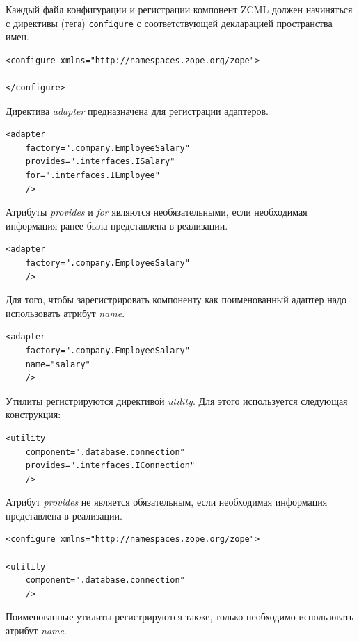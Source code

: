 \documentclass[a4paper,openany,twoside,final]{book}
\providecommand*{\DUroletitlereference}[1]{\textsl{#1}}
\begin{document}
Каждый файл конфигурации и регистрации компонент ZCML должен начиняться с директивы (тега) \texttt{configure} с соответствующей декларацией пространства имен.

\begin{verbatim}
<configure xmlns="http://namespaces.zope.org/zope">

</configure>
\end{verbatim}

Директива \DUroletitlereference{adapter} предназначена для регистрации адаптеров.

\begin{verbatim}
<adapter
    factory=".company.EmployeeSalary"
    provides=".interfaces.ISalary"
    for=".interfaces.IEmployee"
    />
\end{verbatim}

Атрибуты \DUroletitlereference{provides} и \DUroletitlereference{for} являются необязательными, если необходимая информация ранее была представлена в реализации.

\begin{verbatim}
<adapter
    factory=".company.EmployeeSalary"
    />
\end{verbatim}

Для того, чтобы зарегистрировать компоненту как поименованный адаптер надо использовать атрибут \DUroletitlereference{name}.

\begin{verbatim}
<adapter
    factory=".company.EmployeeSalary"
    name="salary"
    />
\end{verbatim}

Утилиты регистрируются директивой \DUroletitlereference{utility}.  Для этого используется следующая конструкция:

\begin{verbatim}
<utility
    component=".database.connection"
    provides=".interfaces.IConnection"
    />
\end{verbatim}

Атрибут \DUroletitlereference{provides} не является обязательным, если необходимая информация представлена в реализации.

\begin{verbatim}
<configure xmlns="http://namespaces.zope.org/zope">

<utility
    component=".database.connection"
    />
\end{verbatim}

Поименованные утилиты регистрируются также, только необходимо использовать атрибут \DUroletitlereference{name}.
\end{document}
